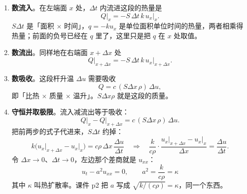\documentclass[11pt]{ctexart}
\begin{document}
\begin{enumerate}[label=\textbf{第 \arabic* 步}]
  \item \textbf{数流入}。在左端面 $x$ 处，$\Delta t$ 内流进这段的热量是
  \begin{equation}
    Q\big|_x=-S\,\Delta t\,k\,u_x\big|_x .
  \end{equation}
  $S\Delta t$ 是「面积 $\times$ 时间」，$q=-ku_x$ 是单位面积单位时间的热量，两者相乘得热量；前面的负号已经在 $q$ 里了，这里只是把 $q$ 在 $x$ 处取值。

  \item \textbf{数流出}。同样地在右端面 $x+\Delta x$ 处
  \begin{equation}
    Q\big|_{x+\Delta x}=-S\,\Delta t\,k\,u_x\big|_{x+\Delta x} .
  \end{equation}

  \item \textbf{数吸收}。这段杆升温 $\Delta u$ 需要吸收
  \begin{equation}
    Q=c\,(S\Delta x\,\rho)\,\Delta u ,
  \end{equation}
  即「比热 $\times$ 质量 $\times$ 温升」。$S\Delta x\rho$ 就是这段的质量。

  \item \textbf{守恒并取极限}。流入减流出等于吸收：
  \begin{equation}
    Q\big|_x-Q\big|_{x+\Delta x}=c\,(S\Delta x\,\rho)\,\Delta u .
  \end{equation}
  把前两步的式子代进来，$S\Delta t$ 约掉：
  \begin{equation}
    k\Big(u_x\big|_{x+\Delta x}-u_x\big|_x\Big)=c\rho\,\Delta x\,\frac{\Delta u}{\Delta t}
    \quad\Longrightarrow\quad
    \frac{k}{c\rho}\cdot\frac{u_x\big|_{x+\Delta x}-u_x\big|_x}{\Delta x}=\frac{\Delta u}{\Delta t}.
  \end{equation}
  令 $\Delta x\to0$、$\Delta t\to0$，左边那个差商就是 $u_{xx}$：
  \begin{equation}
    \boxed{\;u_t-a^2u_{xx}=0,\qquad a^2=\frac{k}{c\rho}=\kappa\;}
  \end{equation}
  其中 $\kappa$ 叫热扩散率。课件 p2 把 $a$ 写成 $\sqrt{k/(c\rho)}=\kappa$，同一个东西。
\end{enumerate}
\end{document}
